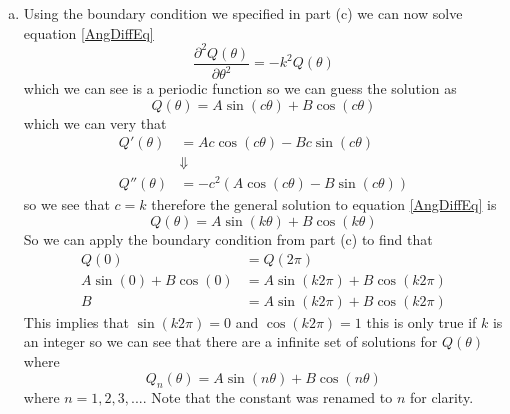 \documentclass[11pt]{article}
\numberwithin{equation}{section}
\begin{document}
\begin{enumerate}[(a)]
\item
Using the boundary condition we specified in part (c) we can now solve equation \ref{AngDiffEq}
$$\frac{\partial^2 Q(\theta)}{\partial\theta^2} = -k^2Q(\theta)$$
which we can see is a periodic function so we can guess the solution as
$$Q(\theta) = A\sin(c\theta) + B\cos(c\theta)$$
which we can very that
\begin{align*}
Q'(\theta) &= Ac\cos(c\theta) - Bc\sin(c\theta)\\
&\Downarrow\\
Q''(\theta) &= -c^2(A\cos(c\theta) - B\sin(c\theta))
\end{align*}
so we see that $c = k$ therefore the general solution to equation \ref{AngDiffEq} is
$$Q(\theta) = A \sin(k\theta) + B\cos(k\theta)$$
So we can apply the boundary condition from part (c) to find that
\begin{align*}
Q(0) &= Q(2\pi)\\
A\sin(0) + B\cos(0) &= A\sin(k2\pi) + B\cos(k2\pi)\\
B &= A\sin(k2\pi) + B\cos(k2\pi)
\end{align*}
This implies that $\sin(k2\pi) = 0$ and $\cos(k2\pi) = 1$ this is only true if $k$ is an integer so we can see that there are a infinite set of solutions for $Q(\theta)$ where
$$Q_n(\theta) = A\sin(n\theta) + B\cos(n\theta)$$
where $n = 1,2,3,...$. Note that the constant was renamed to $n$ for clarity.


\end{enumerate}
\end{document}
